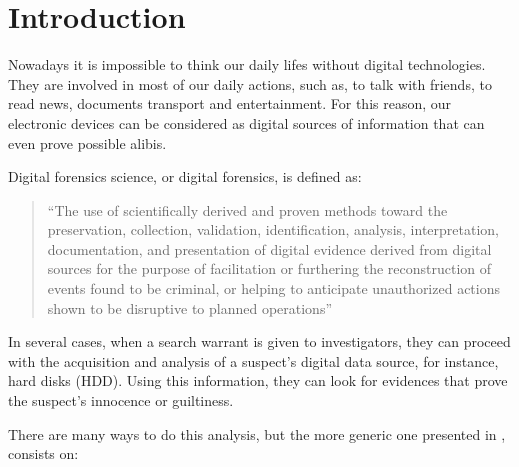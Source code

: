 \cleardoublepage
{}
\chapter*{Introduction}

Nowadays it is impossible to think our daily lifes without digital
technologies. They are involved in most of our daily actions, such as, to talk
with friends, to read news, documents transport and entertainment. For this
reason, our electronic devices can be considered as digital sources of 
information that can even prove possible alibis.

Digital forensics science, or digital forensics, is defined as:

\begin{quote}
“The use of scientifically derived and proven methods toward the preservation,
collection, validation, identification, analysis, interpretation,
documentation, and presentation of digital evidence derived from digital
sources for the purpose of facilitation or furthering the reconstruction of
events found to be criminal, or helping to anticipate unauthorized actions
shown to be disruptive to planned operations” \cite{DFRWS-df-road-map}
\end{quote}

In several cases, when a search warrant is given to investigators, they can
proceed with the acquisition and analysis of a suspect's digital data source,
for instance, hard disks (HDD). Using this information, they can look for
evidences that prove the suspect's innocence or guiltiness.

There are many ways to do this analysis, but the more generic one presented in
\cite{ds-phases}, consists on:

